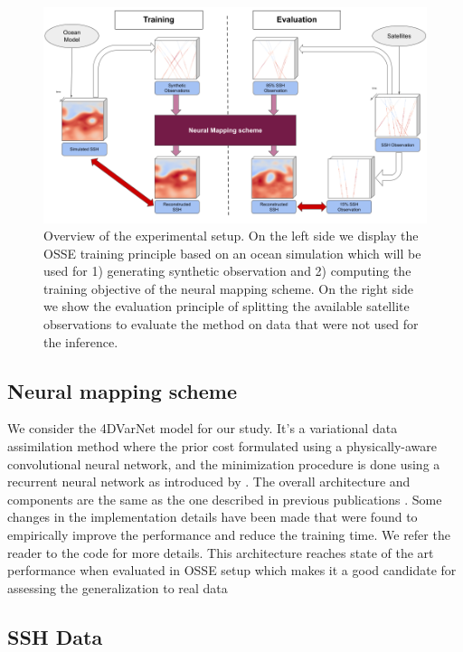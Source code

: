 \begin{bibunit}
\begin{figure}[ht]
    \centering
    \includegraphics[width=\textwidth]{00_Simulearning/figures/schema_method.png}
    \caption{Overview of the experimental setup. On the left side we display the OSSE training principle based on an ocean simulation which will be used for 1) generating synthetic observation and 2) computing the training objective of the neural mapping scheme. On the right side we show the evaluation principle of splitting the available satellite observations to evaluate the method on data that were not used for the inference.}
    \label{fig:method}
\end{figure}


\subsection{Neural mapping scheme}
\label{ssec:4dvarnet}

We consider the 4DVarNet model for our study. It's a variational data assimilation method where the prior cost formulated using a physically-aware convolutional neural network, and the minimization procedure is done using a recurrent neural network as introduced by \cite{andrychowiczLearningLearnGradient}.
The overall architecture and components are the same as the one described in previous publications \cite{fabletENDTOENDPHYSICSINFORMEDREPRESENTATION2021}. Some changes in the implementation details have been made that were found to empirically improve the performance and reduce the training time. We refer the reader to the code for more details.
This architecture reaches state of the art performance when evaluated in OSSE setup which makes it a good candidate for assessing the generalization to real data


\subsection{SSH Data}
\label{ssec:data}


\end{bibunit}
